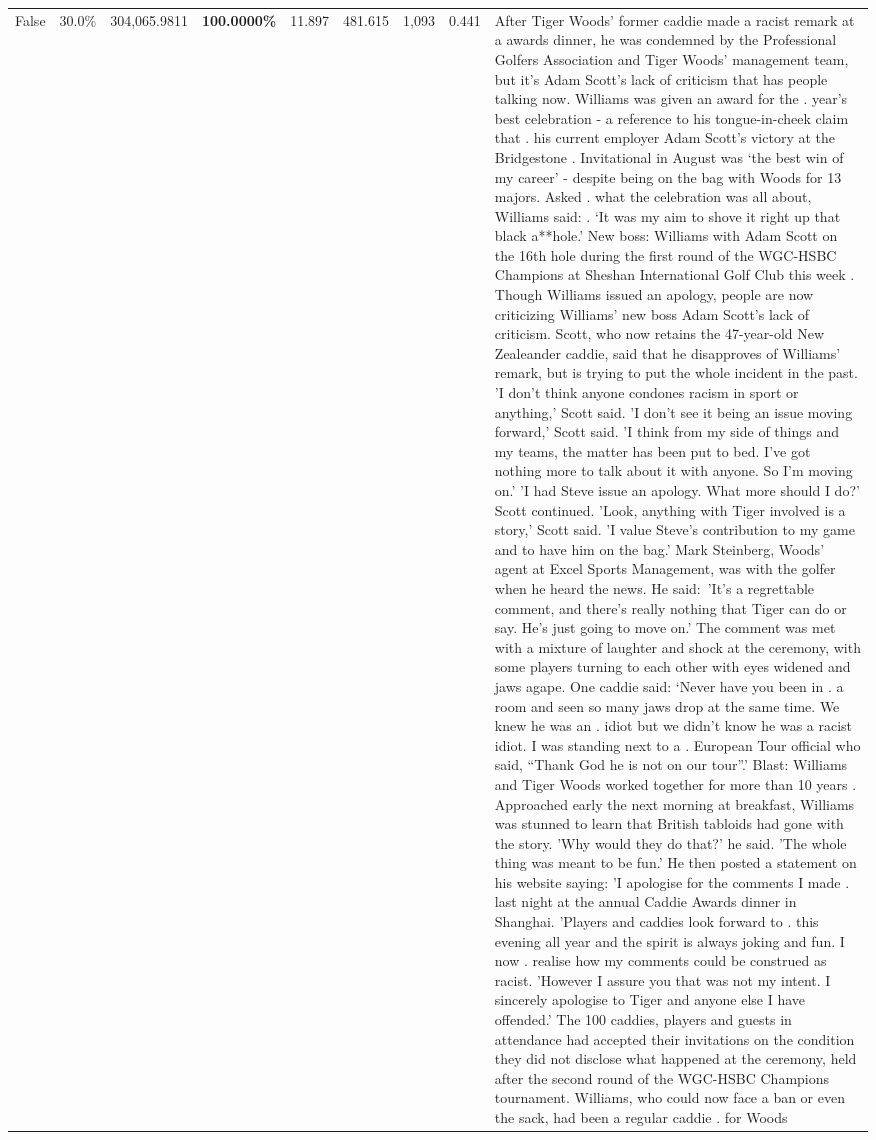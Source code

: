 \begin{table}[H]
\begin{tabular}{lllrlllll}
False & 30.0\% & \color{red} 304,065.9811 & \bfseries \color{red} 100.0000\% & 11.897 & 481.615 & 1,093 & 0.441 & After Tiger Woods' former caddie made a racist remark at a awards dinner, he was condemned by the Professional Golfers Association and Tiger Woods' management team, but it's Adam Scott's lack of criticism that has people talking now. Williams was given an award for the . year’s best celebration - a reference to his tongue-in-cheek claim that . his current employer Adam Scott’s victory at the Bridgestone . Invitational in August was ‘the best win of my career’ - despite being on the bag with Woods for 13 majors. Asked . what the celebration was all about, Williams said: . ‘It was my aim to shove it right up that black a**hole.’ New boss: Williams with Adam Scott  on the 16th hole during the first round of the WGC-HSBC Champions at Sheshan International Golf Club this week . Though Williams issued an apology, people are now criticizing Williams' new boss Adam Scott's lack of criticism. Scott, who now retains the 47-year-old New Zealeander caddie, said that he disapproves of Williams' remark, but is trying to put the whole incident in the past. 'I don't think anyone condones racism in sport or anything,' Scott said. 'I don't see it being an issue moving forward,' Scott said. 'I think from my side of things and my teams, the matter has been put to bed. I've got nothing more to talk about it with anyone. So I'm moving on.' 'I had Steve issue an apology. What more should I do?' Scott continued. 'Look, anything with Tiger involved is a story,' Scott said. 'I value Steve's contribution to my game and to have him on the bag.' Mark Steinberg, Woods' agent at Excel Sports Management, was with the golfer when he heard the news. He said: 'It's a regrettable comment, and there's really nothing that Tiger can do or say. He's just going to move on.' The comment was met with a mixture of laughter and shock at the ceremony, with some players turning to each other with eyes widened and jaws agape. One caddie said: ‘Never have you been in . a room and seen so many jaws drop at the same time. We knew he was an . idiot but we didn’t know he was a racist idiot. I was standing next to a . European Tour official who said, “Thank God he is not on our tour”.’ Blast: Williams and Tiger Woods worked together for more than 10 years . Approached early the next morning at breakfast, Williams was stunned to learn that British tabloids had gone with the story. 'Why would they do that?' he said. 'The whole thing was meant to be fun.' He then posted a statement on his website saying: 'I apologise for the comments I made . last night at the annual Caddie Awards dinner in Shanghai. 'Players and caddies look forward to . this evening all year and the spirit is always joking and fun. I now . realise how my comments could be construed as racist. 'However I assure you that was not my intent. I sincerely apologise to Tiger and anyone else I have offended.' The 100 caddies, players and guests in attendance had accepted their invitations on the condition they did not disclose what happened at the ceremony, held after the second round of the WGC-HSBC Champions tournament. Williams, who could now face a ban or even the sack, had been a regular caddie . for Woods 
\end{tabular}
\end{table}

